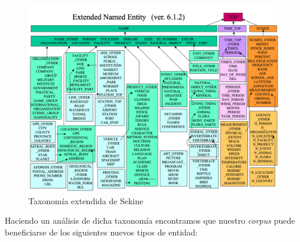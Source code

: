 \documentclass[12pt,a4paper,]{scrartcl}
\begin{document}
\begin{figure}[H]

{\centering \includegraphics{assets/sekine.pdf} 

}

\caption{Taxonomía extendida de Sekine}\label{fig:fig-sekine}
\end{figure}

Haciendo un análisis de dicha taxonomía encontramos que nuestro \emph{corpus} puede beneficiarse de los siguientes nuevos tipos de entidad:
\end{document}
